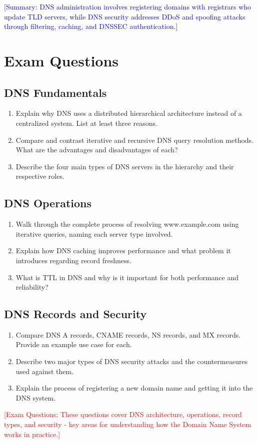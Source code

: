 \documentclass[12pt]{article}
\begin{document}
\textcolor{blue}{[Summary: DNS administration involves registering domains with registrars who update TLD servers, while DNS security addresses DDoS and spoofing attacks through filtering, caching, and DNSSEC authentication.]}

\section*{Exam Questions}

\subsection*{DNS Fundamentals}
\begin{enumerate}
    \item Explain why DNS uses a distributed hierarchical architecture instead of a centralized system. List at least three reasons.
    \item Compare and contrast iterative and recursive DNS query resolution methods. What are the advantages and disadvantages of each?
    \item Describe the four main types of DNS servers in the hierarchy and their respective roles.
\end{enumerate}

\subsection*{DNS Operations}
\begin{enumerate}
    \item Walk through the complete process of resolving www.example.com using iterative queries, naming each server type involved.
    \item Explain how DNS caching improves performance and what problem it introduces regarding record freshness.
    \item What is TTL in DNS and why is it important for both performance and reliability?
\end{enumerate}

\subsection*{DNS Records and Security}
\begin{enumerate}
    \item Compare DNS A records, CNAME records, NS records, and MX records. Provide an example use case for each.
    \item Describe two major types of DNS security attacks and the countermeasures used against them.
    \item Explain the process of registering a new domain name and getting it into the DNS system.
\end{enumerate}

\textcolor{red}{[Exam Questions: These questions cover DNS architecture, operations, record types, and security - key areas for understanding how the Domain Name System works in practice.]}
\end{document}
